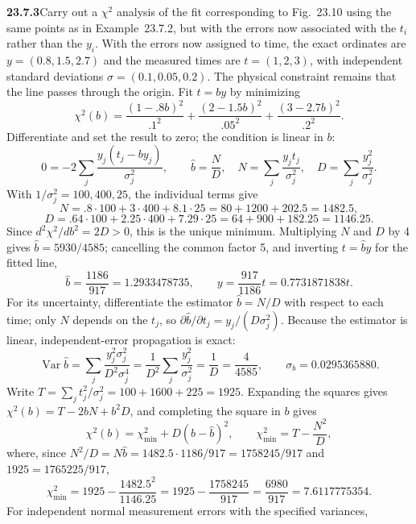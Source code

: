 \par\bigskip
\noindent\textbf{23.7.3}\quad Carry out a $\chi^{2}$ analysis of
the fit corresponding to Fig.~23.10 using the same points as in
Example~23.7.2, but with the errors now associated with the
$t_{i}$ rather than the $y_{i}$.
\solution
{}
With the errors now assigned to time, the exact ordinates are
$y=(0.8,1.5,2.7)$ and the measured times are $t=(1,2,3)$,
with independent standard deviations $\sigma=(0.1,0.05,0.2)$.
The physical constraint remains that the line passes through the origin.
Fit $t=by$ by minimizing
\[
\chi^2(b)=\frac{(1-.8b)^2}{.1^2}
+\frac{(2-1.5b)^2}{.05^2}
+\frac{(3-2.7b)^2}{.2^2}.
\]
Differentiate and set the result to zero; the condition is linear
in $b$:
\[
0=-2\sum_j\frac{y_j(t_j-by_j)}{\sigma_j^2},\qquad
\widehat b=\frac ND,
\quad N=\sum_j\frac{y_jt_j}{\sigma_j^2},\quad
D=\sum_j\frac{y_j^2}{\sigma_j^2}.
\]
With $1/\sigma_j^2=100,400,25$, the individual terms give
\[
N=.8\cdot100+3\cdot400+8.1\cdot25=80+1200+202.5=1482.5,
\]
\[
D=.64\cdot100+2.25\cdot400+7.29\cdot25=64+900+182.25=1146.25.
\]
Since $d^2\chi^2/db^2=2D>0$, this is the unique minimum.
Multiplying $N$ and $D$ by 4 gives $\widehat b=5930/4585$; cancelling
the common factor 5, and inverting $t=\widehat by$ for the fitted line,
\[
\boxed{\widehat b=\frac{1186}{917}=1.2933478735,
\qquad y=\frac{917}{1186}t=0.7731871838t}.
\]
For its uncertainty, differentiate the estimator $\widehat b=N/D$ with
respect to each time; only $N$ depends on the $t_j$, so
$\partial\widehat b/\partial t_j=y_j/(D\sigma_j^2)$.
Because the estimator is linear, independent-error propagation is exact:
\[
\operatorname{Var}\widehat b
=\sum_j\frac{y_j^2\sigma_j^2}{D^2\sigma_j^4}
=\frac1{D^2}\sum_j\frac{y_j^2}{\sigma_j^2}
=\frac1D=\frac4{4585},\qquad
\boxed{\sigma_b=0.0295365880}.
\]
Write $T=\sum_jt_j^2/\sigma_j^2=100+1600+225=1925$. Expanding the
squares gives $\chi^2(b)=T-2bN+b^2D$, and completing the square in $b$
gives
\[
\chi^2(b)=\chi^2_{\min}+D(b-\widehat b)^2,
\qquad
\chi^2_{\min}=T-\frac{N^2}D,
\]
where, since $N^2/D=N\widehat b=1482.5\cdot1186/917=1758245/917$ and
$1925=1765225/917$,
\[
\chi^2_{\min}=1925-\frac{1482.5^2}{1146.25}
=1925-\frac{1758245}{917}
=\frac{6980}{917}=7.6117775354.
\]
For independent normal measurement errors with the specified variances,
